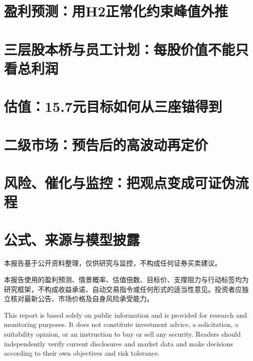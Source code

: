 \documentclass[a4paper,11pt,openany,fontset=none]{ctexrep}
\newcommand{\reportdisclaimer}{本报告基于公开资料整理，仅供研究与监控，不构成任何证券买卖建议。}
\begin{document}
\chapter{盈利预测：用H2正常化约束峰值外推}


\chapter{三层股本桥与员工计划：每股价值不能只看总利润}


\chapter{估值：15.7元目标如何从三座锚得到}


\chapter{二级市场：预告后的高波动再定价}


\chapter{风险、催化与监控：把观点变成可证伪流程}


\appendix

\chapter{公式、来源与模型披露}


\medskip
\begin{disclosurebox}[免责声明]
\small
\reportdisclaimer\par
本报告使用的盈利预测、情景概率、估值倍数、目标价、支撑阻力与行动标签均为研究框架，不构成收益承诺、自动交易指令或任何形式的适当性意见。投资者应独立核对最新公告、市场价格及自身风险承受能力。

This report is based solely on public information and is provided for research and monitoring purposes. It does not constitute investment advice, a solicitation, a suitability opinion, or an instruction to buy or sell any security. Readers should independently verify current disclosures and market data and make decisions according to their own objectives and risk tolerance.
\end{disclosurebox}
\end{document}
